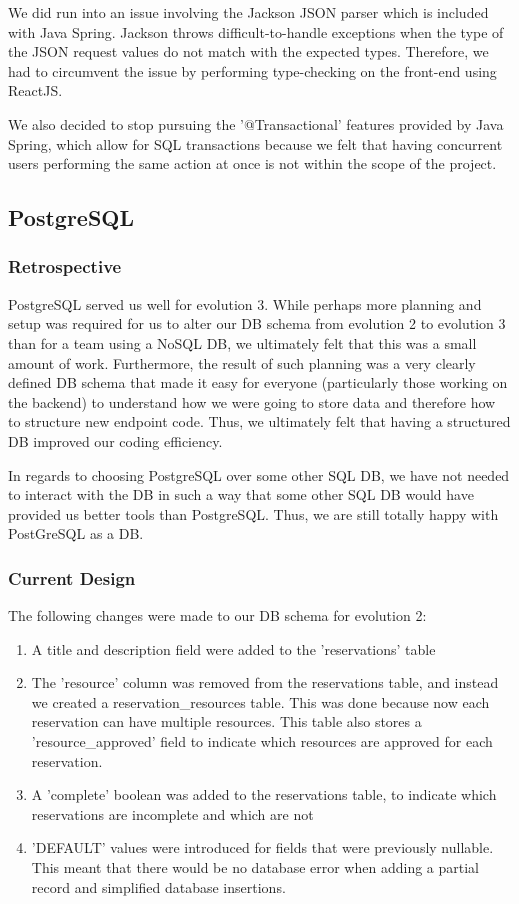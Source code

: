 \documentclass[12pt]{article}
\begin{document}
We did run into an issue involving the Jackson JSON parser which is included with Java Spring. Jackson throws difficult-to-handle exceptions when the type of the JSON request values do not match with the expected types. Therefore, we had to circumvent the issue by performing type-checking on the front-end using ReactJS.

We also decided to stop pursuing the '@Transactional' features provided by Java Spring, which allow for SQL transactions because we felt that having concurrent users performing the same action at once is not within the scope of the project. 

\subsection{PostgreSQL}
\subsubsection{Retrospective}
PostgreSQL served us well for evolution 3. While perhaps more planning and setup was required for us to alter our DB schema from evolution 2 to evolution 3 than for a team using a NoSQL DB, we ultimately felt that this was a small amount of work. Furthermore, the result of such planning was a very clearly defined DB schema that made it easy for everyone (particularly those working on the backend) to understand how we were going to store data and therefore how to structure new endpoint code. Thus, we ultimately felt that having a structured DB improved our coding efficiency. 

In regards to choosing PostgreSQL over some other SQL DB, we have not needed to interact with the DB in such a way that some other SQL DB would have provided us better tools than PostgreSQL. Thus, we are still totally happy with PostGreSQL as a DB. 

\subsubsection{Current Design}
The following changes were made to our DB schema for evolution 2:

\begin{enumerate}
    \item A title and description field were added to the 'reservations' table
    \item The 'resource' column was removed from the reservations table, and instead we created a reservation\_resources table. This was done because now each reservation can have multiple resources. This table also stores a 'resource\_approved' field to indicate which resources are approved for each reservation. 
    \item A 'complete' boolean was added to the reservations table, to indicate which reservations are incomplete and which are not
    \item 'DEFAULT' values were introduced for fields that were previously nullable. This meant that there would be no database error when adding a partial record and simplified database insertions. 
\end{enumerate}
\end{document}
